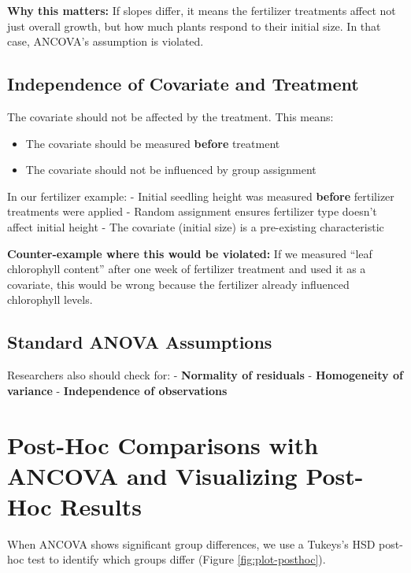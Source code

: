 \documentclass[
]{book}
\providecommand{\tightlist}{%
  \setlength{\itemsep}{0pt}\setlength{\parskip}{0pt}}
\begin{document}
\textbf{Why this matters:} If slopes differ, it means the fertilizer treatments affect not just overall growth, but how much plants respond to their initial size. In that case, ANCOVA's assumption is violated.

\subsection{Independence of Covariate and Treatment}\label{independence-of-covariate-and-treatment}

The covariate should not be affected by the treatment. This means:

\begin{itemize}
\tightlist
\item
  The covariate should be measured \textbf{before} treatment
\item
  The covariate should not be influenced by group assignment
\end{itemize}

In our fertilizer example:
- Initial seedling height was measured \textbf{before} fertilizer treatments were applied
- Random assignment ensures fertilizer type doesn't affect initial height
- The covariate (initial size) is a pre-existing characteristic

\textbf{Counter-example where this would be violated:}
If we measured ``leaf chlorophyll content'' after one week of fertilizer treatment and used it as a covariate, this would be wrong because the fertilizer already influenced chlorophyll levels.

\subsection{Standard ANOVA Assumptions}\label{standard-anova-assumptions}

Researchers also should check for:
- \textbf{Normality of residuals}
- \textbf{Homogeneity of variance}
- \textbf{Independence of observations}

\section{Post-Hoc Comparisons with ANCOVA and Visualizing Post-Hoc Results}\label{post-hoc-comparisons-with-ancova-and-visualizing-post-hoc-results}

When ANCOVA shows significant group differences, we use a Tukeys's HSD post-hoc test to identify which groups differ (Figure \ref{fig:plot-posthoc}).
\end{document}

